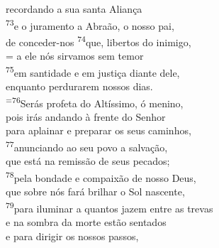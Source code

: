 \documentclass{book}
\begin{document}
\begin{center}
    recordando a sua santa Aliança
    \vspace{.2cm} \\
    \textsuperscript{\underline{\hspace{.06in}}\textcolor{VioletRed2}{73}}e o juramento a Abraão, o nosso pai, \textsuperscript{\gresixstar{}} \\
    de conceder-nos \textsuperscript{\textcolor{VioletRed2}{74}}que, libertos do inimigo,
    \vspace{.2cm} \\
    = a ele nós sirvamos sem temor \dag{} \\
    \textsuperscript{\textcolor{VioletRed2}{75}}em santidade e em justiça diante dele, \textsuperscript{\gresixstar{}} \\
    enquanto perdurarem nossos dias.
    \vspace{.2cm} \\
    \textsuperscript{=\textcolor{VioletRed2}{76}}Serás profeta do Altíssimo, ó menino, \dag{} \\
    pois irás andando à frente do Senhor \textsuperscript{\gresixstar{}} \\
    para aplainar e preparar os seus caminhos,
    \vspace{.2cm} \\
    \textsuperscript{\underline{\hspace{.06in}}\textcolor{VioletRed2}{77}}anunciando ao seu povo a salvação, \textsuperscript{\gresixstar{}} \\
    que está na remissão de seus pecados;
    \vspace{.2cm} \\
    \textsuperscript{\underline{\hspace{.06in}}\textcolor{VioletRed2}{78}}pela bondade e compaixão de nosso Deus, \textsuperscript{\gresixstar{}} \\
    que sobre nós fará brilhar o Sol nascente,
    \vspace{.2cm} \\
    \textsuperscript{\underline{\hspace{.06in}}\textcolor{VioletRed2}{79}}para iluminar a quantos jazem entre as trevas \textsuperscript{\gresixstar{}} \\
    e na sombra da morte estão sentados
    \vspace{.2cm} \\
    \textsuperscript{\underline{\hspace{.06in}}} e para dirigir os nossos passos, \textsuperscript{\gresixstar{}} \\

\end{center}
\end{document}
